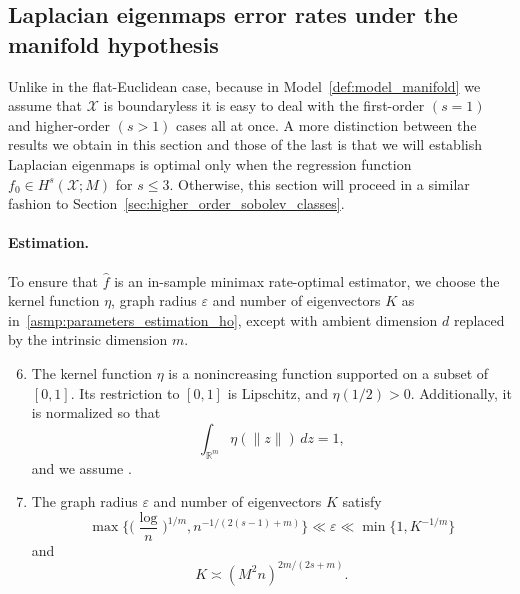 \documentclass{article}
\newcommand{\Reals}{\mathbb{R}}
\newcommand{\1}{\mathbf{1}}
\newcommand{\mc}[1]{\mathcal{#1}}
\newcommand{\wh}[1]{\widehat{#1}}
\theoremstyle{alden}
\theoremstyle{aldenthm}
\theoremstyle{definition}
\theoremstyle{remark}
\begin{document}
\subsection{Laplacian eigenmaps error rates under the manifold hypothesis}
Unlike in the flat-Euclidean case, because in Model~\ref{def:model_manifold} we assume that $\mc{X}$ is boundaryless it is easy to deal with the first-order $(s = 1)$ and higher-order $(s > 1)$ cases all at once. A more distinction between the results we obtain in this section and those of the last is that we will establish Laplacian eigenmaps is optimal only when the regression function $f_0 \in H^s(\mc{X};M)$ for $s \leq 3$. Otherwise, this section will proceed in a similar fashion to Section~\ref{sec:higher_order_sobolev_classes}.

\paragraph{Estimation.}
To ensure that $\wh{f}$ is an in-sample minimax rate-optimal estimator, we choose the kernel function $\eta$, graph radius $\varepsilon$ and number of eigenvectors $K$ as in~\ref{asmp:parameters_estimation_ho}, except with ambient dimension $d$ replaced by the intrinsic dimension $m$.

\begin{enumerate}[label=(A\arabic*)]
	\setcounter{enumi}{5}
	\item 
	\label{asmp:kernel_manifold}
	The kernel function $\eta$ is a nonincreasing function supported on a subset of $[0,1]$. Its restriction to $[0,1]$ is Lipschitz, and $\eta(1/2) > 0$. Additionally, it is normalized so that
	\begin{equation*}
	\int_{\Reals^m} \eta(\|z\|) \,dz = 1,
	\end{equation*}
	and we assume \smash{$\int_{\Reals^m} \|x\|^2 \eta(\|x\|) \,dx < \infty$}.
	\item 
	\label{asmp:parameters_estimation_manifold}
	The graph radius $\varepsilon$ and number of eigenvectors $K$ satisfy
	\begin{equation}
	\label{eqn:radius_estimation_manifold}
	\max\biggl\{\biggl(\frac{\log}{n}\biggr)^{1/m}, n^{-1/(2(s - 1) + m)}\biggr\} \ll \varepsilon \ll \min\{1, K^{-1/m}\}
	\end{equation}
	and
	\begin{equation*}
	K \asymp (M^2n)^{2m/(2s + m)}.
	\end{equation*}
\end{enumerate}
\end{document}
